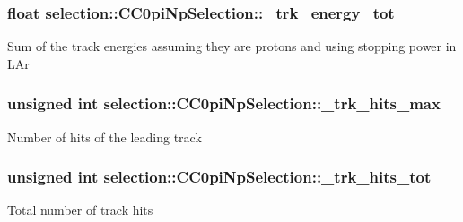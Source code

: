 \subsubsection[{\texorpdfstring{\+\_\+trk\+\_\+energy\+\_\+tot}{_trk_energy_tot}}]{\setlength{\rightskip}{0pt plus 5cm}float selection\+::\+C\+C0pi\+Np\+Selection\+::\+\_\+trk\+\_\+energy\+\_\+tot\hspace{0.3cm}{\ttfamily [private]}}\hypertarget{classselection_1_1CC0piNpSelection_a8a0da0081e2f182880249debba6551e3}{}\label{classselection_1_1CC0piNpSelection_a8a0da0081e2f182880249debba6551e3}
Sum of the track energies assuming they are protons and using stopping power in L\+Ar 
\subsubsection[{\texorpdfstring{\+\_\+trk\+\_\+hits\+\_\+max}{_trk_hits_max}}]{\setlength{\rightskip}{0pt plus 5cm}unsigned int selection\+::\+C\+C0pi\+Np\+Selection\+::\+\_\+trk\+\_\+hits\+\_\+max\hspace{0.3cm}{\ttfamily [private]}}\hypertarget{classselection_1_1CC0piNpSelection_a247d186cb641d28f8ea5b02c4f2a39bc}{}\label{classselection_1_1CC0piNpSelection_a247d186cb641d28f8ea5b02c4f2a39bc}
Number of hits of the leading track 
\subsubsection[{\texorpdfstring{\+\_\+trk\+\_\+hits\+\_\+tot}{_trk_hits_tot}}]{\setlength{\rightskip}{0pt plus 5cm}unsigned int selection\+::\+C\+C0pi\+Np\+Selection\+::\+\_\+trk\+\_\+hits\+\_\+tot\hspace{0.3cm}{\ttfamily [private]}}\hypertarget{classselection_1_1CC0piNpSelection_a420b9962478d7998282e03f1ccf89c2e}{}\label{classselection_1_1CC0piNpSelection_a420b9962478d7998282e03f1ccf89c2e}
Total number of track hits 
